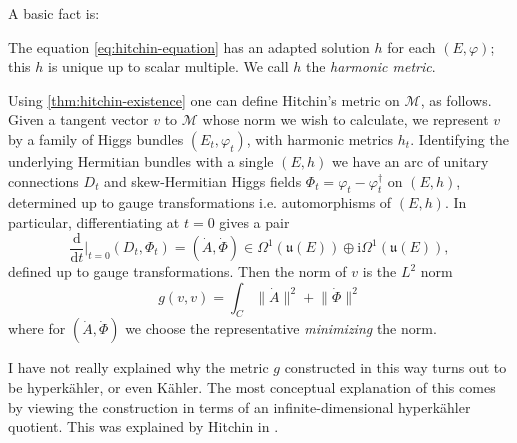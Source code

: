 \documentclass[12pt,letterpaper,reqno]{article}
\numberwithin{equation}{section}
\newcommand{\fu}{{\mathfrak u}}
\newcommand{\cM}{\ensuremath{\mathcal M}}
\newcommand{\kahler}{K\"ahler\xspace}
\newcommand{\hk}{hyperk\"ahler\xspace}
\newcommand{\Hk}{Hyperk\"ahler\xspace}
\newcommand{\I}{{\mathrm i}}
\newcommand{\de}{\mathrm{d}}
\newcommand{\norm}[1]{\lVert#1\rVert}
\newcommand{\ti}[1]{\textit{#1}}
\begin{document}
A basic fact is:
\begin{thm} \label{thm:hitchin-existence}
The equation \eqref{eq:hitchin-equation} has an
adapted solution $h$ for each $(E,\varphi)$;
this $h$ is unique up to scalar multiple.
We call $h$ the \ti{harmonic metric}.
\end{thm}

Using \autoref{thm:hitchin-existence}
one can define Hitchin's metric on $\cM$, as follows.
Given a tangent vector $v$ to $\cM$ whose norm we wish to calculate, we represent $v$ by a family of Higgs bundles
$(E_t,\varphi_t)$, with harmonic metrics $h_t$.
Identifying the underlying Hermitian bundles with a single $(E,h)$
we have an arc of unitary connections $D_t$ and skew-Hermitian 
Higgs fields $\Phi_t = \varphi_t - \varphi_t^\dagger$ 
on $(E,h)$, determined up to gauge transformations i.e. 
automorphisms of $(E,h)$.
In particular, differentiating at $t = 0$ gives a pair
\begin{equation}
\frac{\de}{\de t}\Bigg\rvert_{t=0} (D_t, \Phi_t) = 
(\dot A, \dot \Phi) \in \Omega^1(\fu(E)) \oplus \I \Omega^{1}(\fu(E)),
\end{equation}
defined up to gauge transformations.
Then the norm of $v$ is the $L^2$ norm
\begin{equation}
  g(v,v) = \int_C \norm{\dot A}^2 + \norm{\dot \Phi}^2
\end{equation}
where for $(\dot A, \dot \Phi)$ we choose the representative
\ti{minimizing} the norm.

\begin{remark}[\Hk quotient] I have not really explained
why the metric $g$ constructed in this way turns out to 
be \hk, or even \kahler. The most conceptual explanation
of this comes by viewing the construction in terms of 
an infinite-dimensional \hk quotient.
This was explained by
Hitchin in \cite{MR89a:32021}.

\end{remark}

\end{document}
